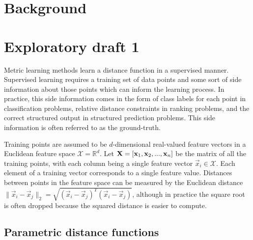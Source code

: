 \section{Background}











\section*{Exploratory draft 1}

Metric learning methods learn a distance function in a supervised manner. Supervised learning requires a training set of data points and some sort of side information about those points which can inform the learning process. In practice, this side information comes in the form of class labels for each point in classification problems, relative distance constraints in ranking problems, and the correct structured output in structured prediction problems. This side information is often referred to as the ground-truth.

Training points are assumed to be $d$-dimensional real-valued feature vectors in a Euclidean feature space $\mathcal{X} = \mathbb{R}^d$. Let $\mathbf{X} = \left[ \mathbf{x}_1, \mathbf{x}_2, ..., \mathbf{x}_n \right]$ be the matrix of all the training points, with each column being a single feature vector $\vec{x}_i \in \mathcal{X}$. Each element of a training vector corresponds to a single feature value. Distances between points in the feature space can be measured by the Euclidean distance $\|\vec{x}_i - \vec{x}_j\|_2 = \sqrt{(\vec{x}_i - \vec{x}_j)^T(\vec{x}_i - \vec{x}_j)}$, although in practice the square root is often dropped because the squared distance is easier to compute.



\subsection{Parametric distance functions}

